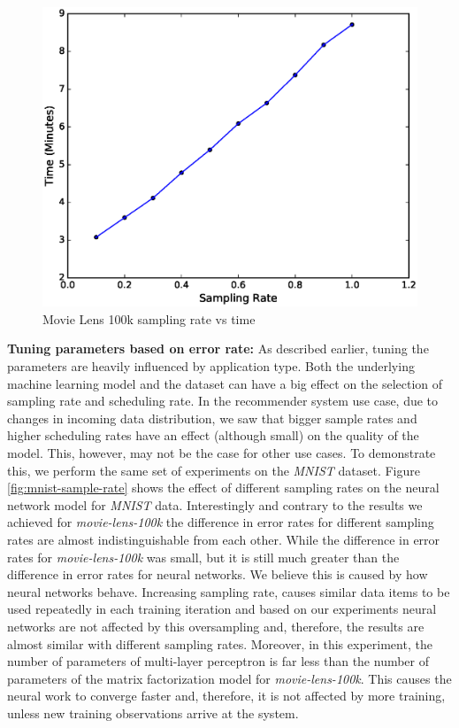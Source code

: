 \documentclass{sig-alternate-05-2015}
\begin{document}
\begin{figure}[H]
\centering
\includegraphics[width=\columnwidth]{../images/experiment-results/movie-lens-100k-sampling-time.eps}
\caption{Movie Lens 100k sampling rate vs time}
\label{fig:movie-lens-100k-sample-rate-time}
\end{figure}

\textbf{Tuning parameters based on error rate:} As described earlier, tuning the parameters are heavily influenced by application type.
Both the underlying machine learning model and the dataset can have a big effect on the selection of sampling rate and scheduling rate.
In the recommender system use case, due to changes in incoming data distribution, we saw that bigger sample rates and higher scheduling rates have an effect (although small) on the quality of the model.
This, however, may not be the case for other use cases.
To demonstrate this, we perform the same set of experiments on the \textit{MNIST} dataset.
Figure \ref{fig:mnist-sample-rate} shows the effect of different sampling rates on the neural network model for \textit{MNIST} data.
Interestingly and contrary to the results we achieved for \textit{movie-lens-100k} the difference in error rates for different sampling rates are almost indistinguishable from each other.
While the difference in error rates for \textit{movie-lens-100k} was small, but it is still much greater than the difference in error rates for neural networks.
We believe this is caused by how neural networks behave.
Increasing sampling rate, causes similar data items to be used repeatedly in each training iteration and based on our experiments neural networks are not affected by this oversampling and, therefore, the results are almost similar with different sampling rates.
Moreover, in this experiment, the number of parameters of multi-layer perceptron is far less than the number of parameters of the matrix factorization model for \textit{movie-lens-100k}.
This causes the neural work to converge faster and, therefore, it is not affected by more training, unless new training observations arrive at the system.
\end{document}
